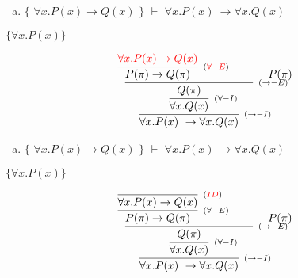 \documentclass[aspectratio=43]{beamer}
\begin{document}
    \begin{frame}[fragile]
    
    	\begin{enumerate}[f)]
			\item $\{$ $\forall x.P(x)\to Q(x) $ $\}$ $\vdash$ $ \forall x.P(x)\ \to \forall x.Q(x) $ \\
		\end{enumerate}
        $ \{\forall x.P(x)\} $
        \vspace{45pt}
        
        \[
        \begin{array}{c}
		
        	\infer[_{(\to -I)}]
            	{\forall x.P(x)\ \to \forall x.Q(x)}
            	{\infer[_{(\forall -I)}] 
                	{\forall x.Q(x)}
                    {\infer[_{(\to -E)}]
                    	{Q(\pi)}
                        {\infer[_{(\textcolor{red}{\forall -E})}]
                        	{P(\pi)\rightarrow Q(\pi)}
                            {\textcolor{red}{\forall x.P(x)\to Q(x)}}
                        \hspace{35pt} 
                        P(\pi)
                        }
                    }
                 }   
        
		\end{array}
        \]
        
	\end{frame}
    
    \begin{frame}[fragile]
    
    	\begin{enumerate}[f)]
			\item $\{$ $\forall x.P(x)\to Q(x) $ $\}$ $\vdash$ $ \forall x.P(x)\ \to \forall x.Q(x) $ \\
		\end{enumerate}
        $ \{\forall x.P(x)\} $
        \vspace{45pt}
        
        \[
        \begin{array}{c}
		
        	\infer[_{(\to -I)}]
            	{\forall x.P(x)\ \to \forall x.Q(x)}
            	{\infer[_{(\forall -I)}] 
                	{\forall x.Q(x)}
                    {\infer[_{(\to -E)}]
                    	{Q(\pi)}
                        {\infer[_{(\forall -E)}]
                        	{P(\pi)\rightarrow Q(\pi)}
                            {\infer[_{(\textcolor{red}{ID})}]
                            	{\forall x.P(x)\to Q(x)}
                            	{}
                            }
                        \hspace{35pt} 
                        P(\pi)
                        }
                    }
                 }   
        
		\end{array}
        \]
        
	\end{frame}
    
\end{document}
